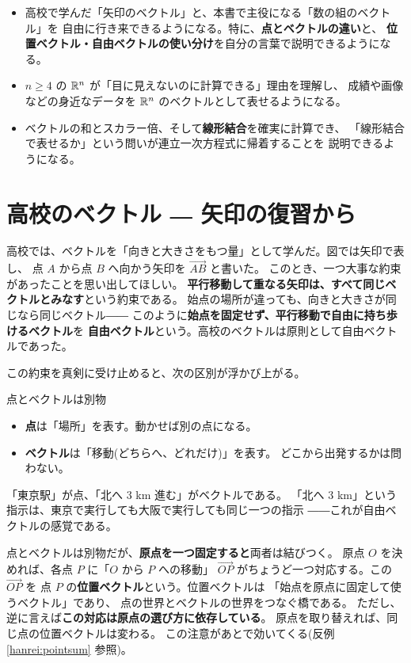 \begin{goal}
\begin{itemize}
\item 高校で学んだ「矢印のベクトル」と、本書で主役になる「数の組のベクトル」を
自由に行き来できるようになる。特に、\textbf{点とベクトルの違い}と、
\textbf{位置ベクトル・自由ベクトルの使い分け}を自分の言葉で説明できるようになる。
\item $n \ge 4$ の $\mathbb{R}^n$ が「目に見えないのに計算できる」理由を理解し、
成績や画像などの身近なデータを $\mathbb{R}^n$ のベクトルとして表せるようになる。
\item ベクトルの和とスカラー倍、そして\textbf{線形結合}を確実に計算でき、
「線形結合で表せるか」という問いが連立一次方程式に帰着することを
説明できるようになる。
\end{itemize}
\end{goal}

\section{高校のベクトル ― 矢印の復習から}

高校では、ベクトルを「向きと大きさをもつ量」として学んだ。図では矢印で表し、
点 $A$ から点 $B$ へ向かう矢印を $\overrightarrow{AB}$ と書いた。
このとき、一つ大事な約束があったことを思い出してほしい。
\textbf{平行移動して重なる矢印は、すべて同じベクトルとみなす}という約束である。
始点の場所が違っても、向きと大きさが同じなら同じベクトル――
このように\textbf{始点を固定せず、平行移動で自由に持ち歩けるベクトル}を
\textbf{自由ベクトル}という。高校のベクトルは原則として自由ベクトルであった。

この約束を真剣に受け止めると、次の区別が浮かび上がる。

\begin{itembox}[l]{点とベクトルは別物}
\begin{itemize}
\item \textbf{点}は「場所」を表す。動かせば別の点になる。
\item \textbf{ベクトル}は「移動(どちらへ、どれだけ)」を表す。
どこから出発するかは問わない。
\end{itemize}
「東京駅」が点、「北へ $3$ km 進む」がベクトルである。
「北へ $3$ km」という指示は、東京で実行しても大阪で実行しても同じ一つの指示
――これが自由ベクトルの感覚である。
\end{itembox}

点とベクトルは別物だが、\textbf{原点を一つ固定すると}両者は結びつく。
原点 $O$ を決めれば、各点 $P$ に「$O$ から $P$ への移動」
$\overrightarrow{OP}$ がちょうど一つ対応する。この $\overrightarrow{OP}$ を
点 $P$ の\textbf{位置ベクトル}という。位置ベクトルは
「始点を原点に固定して使うベクトル」であり、
点の世界とベクトルの世界をつなぐ橋である。
ただし、逆に言えば\textbf{この対応は原点の選び方に依存している}。
原点を取り替えれば、同じ点の位置ベクトルは変わる。
この注意があとで効いてくる(反例 \ref{hanrei:pointsum} 参照)。

